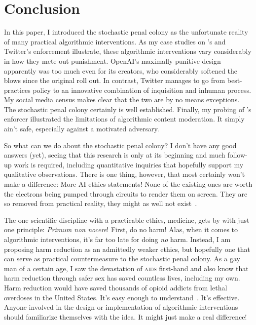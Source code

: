 \section{Conclusion}
\label{sec:conclusion}

In this paper, I introduced the stochastic penal colony as the unfortunate
reality of many practical algorithmic interventions. As my case studies on
\DALLE's and Twitter's enforcement illustrate, these algorithmic interventions
vary considerably in how they mete out punishment. OpenAI's maximally punitive
design apparently was too much even for its creators, who considerably softened
the blows since the original roll out. In contrast, Twitter manages to go from
best-practices policy to an innovative combination of inquisition and inhuman
process. My social media census makes clear that the two are by no means
exceptions. The stochastic penal colony certainly is well established. Finally,
my probing of \DALLE's enforcer illustrated the limitations of algorithmic
content moderation. It simply ain't safe, especially against a motivated
adversary.

So what can we do about the stochastic penal colony? I don't have any good
answers (yet), seeing that this research is only at its beginning and much
follow-up work is required, including quantitative inquiries that hopefully
support my qualitative observations. There is one thing, however, that most
certainly won't make a difference: More AI ethics statements! None of the
existing ones are worth the electrons being pumped through circuits to render
them on screen. They are so removed from practical reality, they might as well
not exist~\cite{Hagendorff2022,Munn2022,WhittlestoneNyrupea2019}.

The one scientific discipline with a practicable ethics, medicine, gets by with
just one principle: \emph{Primum non nocere}! First, do no harm! Alas, when it
comes to algorithmic interventions, it's far too late for doing \emph{no} harm.
Instead, I am proposing harm reduction as an admittedly weaker \AI{} ethics, but
hopefully one that can serve as practical countermeasure to the stochastic penal
colony. As a gay man of a certain age, I saw the devastation of \textsc{aids}
first-hand and also know that harm reduction through safer sex has saved
countless lives, including my own. Harm reduction would have saved thousands of
opioid addicts from lethal overdoses in the United States. It's easy enough to
understand~\cite{HRI2020,HRI2022,MarlattLarimerea2011,OpenSocietyFoundations2021}.
It's effective. Anyone involved in the design or implementation of algorithmic
interventions should familiarize themselves with the idea. It might just make a
real difference!
